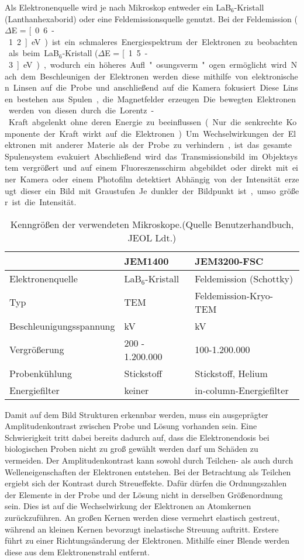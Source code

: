 Als Elektronenquelle wird je nach Mikroskop entweder ein LaB$_6$-Kris\-tall (Lanthanhexaborid) oder eine Feldemissionsquelle genutzt.
Bei der Feldemission ($\Delta$E = \unit[0.6-1.2]{eV}) ist ein schmaleres Energiespektrum der Elektronen zu beobachten als beim LaB$_6$-Kris\-tall ($\Delta$E = \unit[1.5-3]{eV}), wodurch ein höheres Aufl"osungsverm"ogen ermöglicht wird.
Nach dem Beschleunigen der Elektronen werden diese mithilfe von elektronischen Linsen auf die Probe und anschließend auf die Kamera fokusiert.
Diese Linsen bestehen aus Spulen, die Magnetfelder erzeugen.
Die bewegten Elektronen werden von diesen durch die Lorentz-Kraft abgelenkt ohne deren Energie zu beeinflussen (Nur die senkrechte Komponente der Kraft wirkt auf die Elektronen).
Um Wechselwirkungen der Elektronen mit anderer Materie als der Probe zu verhindern, ist das gesamte Spulensystem evakuiert.
Abschließend wird das Transmissionsbild im Objektsystem vergrößert und auf einem Fluoreszensschirm abgebildet oder direkt mit einer Kamera oder einem Photofilm detektiert.
Abhängig von der Intensität erzeugt dieser ein Bild mit Graustufen.
Je dunkler der Bildpunkt ist, umso größer ist die Intensität.
\begin{table}

	\begin{tabular}[h!]{l l l}
			&	JEM1400	&	JEM3200-FSC\\
		\hline
		Elektronenquelle & LaB$_6$-Kristall & Feldemission (Schottky)\\
		Typ	&	TEM	&	Feldemission-Kryo-TEM\\
		Beschleunigungsspannung & \unit[40-120]{kV} & \unit[100-300]{kV}\\
		Vergrößerung & 200 - 1.200.000 & 100-1.200.000\\
		Probenkühlung & Stickstoff & Stickstoff, Helium\\
		Energiefilter & keiner & in-column-Energiefilter\\
		\hline
		\hline


	\end{tabular}
	\caption[Mikroskopdaten]{Kenngrößen der verwendeten Mikroskope.(Quelle Benutzerhandbuch, JEOL Ldt.)}
	\label{TEM_tab}
\end{table}

Damit auf dem Bild Strukturen erkennbar werden, muss ein ausgeprägter Amplitudenkontrast zwischen Probe und Lösung vorhanden sein.
Eine Schwierigkeit tritt dabei bereits dadurch auf, dass die Elektronendosis bei biologischen Proben nicht zu groß gewählt werden darf um Schäden zu vermeiden.
Der Amplitudenkontrast kann sowohl durch Teilchen- als auch durch Welleneigenschaften der Elektronen entstehen. 
Bei der Betrachtung als Teilchen ergiebt sich der Kontrast durch Streueffekte.
Dafür dürfen die Ordnungszahlen der Elemente in der Probe und der Lösung nicht in derselben Größenordnung sein.
Dies ist auf die Wechselwirkung der Elektronen an Atomkernen zurückzuführen.
An großen Kernen werden diese vermehrt elastisch gestreut, während an kleinen Kernen bevorzugt inelastische Streuung auftritt.
Erstere führt zu einer Richtungsänderung der Elektronen.
Mithilfe einer Blende werden diese aus dem Elektronenstrahl entfernt.

